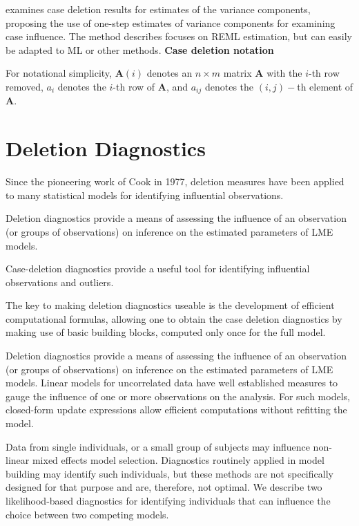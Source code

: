 \documentclass[12pt, a4paper]{report}
\theoremstyle{plain}
\theoremstyle{definition}
\theoremstyle{remark}
\begin{document}
\citet{Christensen}examines case deletion results for estimates of
the variance components, proposing the use of one-step estimates
of variance components for examining case influence. The method
describes focuses on REML estimation, but can easily be adapted to
ML or other methods.
\noindent \textbf{Case deletion notation} %

For notational simplicity, $\boldsymbol{A}(i)$ denotes an $n \times m$ matrix $\boldsymbol{A}$ with the $i$-th row
removed, $a_i$ denotes the $i$-th row of $\boldsymbol{A}$, and $a_{ij}$ denotes the $(i, j)-$th element of $\boldsymbol{A}$.

\section{Deletion Diagnostics}

Since the pioneering work of Cook in 1977, deletion measures have been applied to many statistical models for identifying influential observations.

Deletion diagnostics provide a means of assessing the influence of an observation (or groups of observations) on inference on the estimated parameters of LME models.

Case-deletion diagnostics provide a useful tool for identifying influential observations and outliers.


The key to making deletion diagnostics useable is the development of efficient computational formulas, allowing one to obtain the  case deletion diagnostics by making use of basic building blocks, computed only once for the full model.

Deletion diagnostics provide a means of assessing the influence of an observation (or groups of observations) on inference on the estimated parameters of LME models. Linear models for uncorrelated data have well established measures to gauge the influence of one or more observations on the analysis. For such models, closed-form update expressions allow efficient computations without refitting the model.

Data from single individuals, or a small group of subjects may influence non-linear mixed effects model selection. Diagnostics routinely applied in model building may identify such individuals, but these methods are not specifically designed for that purpose and are, therefore, not optimal. We describe two likelihood-based diagnostics for identifying individuals that can influence the choice between two competing models.
\end{document}
